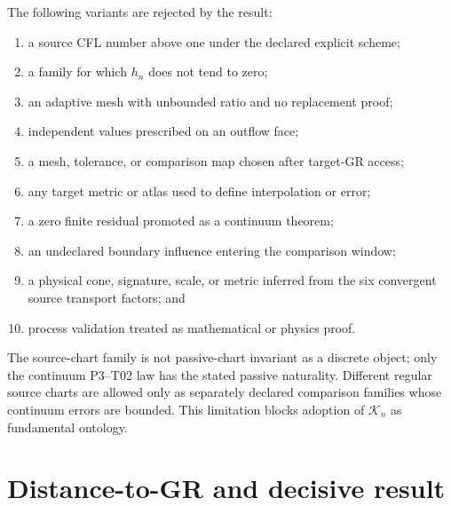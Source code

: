 \documentclass[11pt]{article}
\newcommand{\K}{\mathcal K}
\begin{document}
The following variants are rejected by the result:
\begin{enumerate}[leftmargin=*]
  \item a source CFL number above one under the declared explicit scheme;
  \item a family for which $h_n$ does not tend to zero;
  \item an adaptive mesh with unbounded ratio and no replacement proof;
  \item independent values prescribed on an outflow face;
  \item a mesh, tolerance, or comparison map chosen after target-GR access;
  \item any target metric or atlas used to define interpolation or error;
  \item a zero finite residual promoted as a continuum theorem;
  \item an undeclared boundary influence entering the comparison window;
  \item a physical cone, signature, scale, or metric inferred from the six
        convergent source transport factors; and
  \item process validation treated as mathematical or physics proof.
\end{enumerate}

The source-chart family is not passive-chart invariant as a discrete object;
only the continuum P3--T02 law has the stated passive naturality.  Different
regular source charts are allowed only as separately declared comparison
families whose continuum errors are bounded.  This limitation blocks adoption
of $\K_n$ as fundamental ontology.

\section{Distance-to-GR and decisive result}
\end{document}
